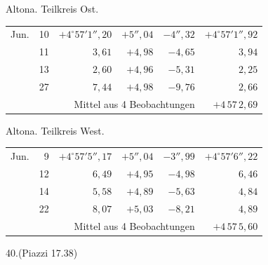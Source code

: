 \noindent\begin{minipage}[t]{.495\textwidth}\centering Altona. Teilkreis Ost.\par\smallskip
{\scriptsize\setlength{\tabcolsep}{1pt}\renewcommand{\arraystretch}{1.2}\begin{tabular}{lr|r|r|r|r|}
Jun.&10&$+4^\circ57'1''{,}20$&$+5''{,}04$&$-4''{,}32$&$+4^\circ57'1''{,}92$\\
&11&$3{,}61$&$+4{,}98$&$-4{,}65$&$3{,}94$\\
&13&$2{,}60$&$+4{,}96$&$-5{,}31$&$2{,}25$\\
&27&$7{,}44$&$+4{,}98$&$-9{,}76$&$2{,}66$\\
\cline{6-6}\multicolumn{5}{r}{Mittel aus 4 Beobachtungen}&$+4\,57\,2{,}69$
\end{tabular}}\end{minipage}\hfill\begin{minipage}[t]{.495\textwidth}\centering Altona. Teilkreis West.\par\smallskip
{\scriptsize\setlength{\tabcolsep}{1pt}\renewcommand{\arraystretch}{1.2}\begin{tabular}{lr|r|r|r|r}
Jun.&9&$+4^\circ57'5''{,}17$&$+5''{,}04$&$-3''{,}99$&$+4^\circ57'6''{,}22$\\
&12&$6{,}49$&$+4{,}95$&$-4{,}98$&$6{,}46$\\
&14&$5{,}58$&$+4{,}89$&$-5{,}63$&$4{,}84$\\
&22&$8{,}07$&$+5{,}03$&$-8{,}21$&$4{,}89$\\
\cline{6-6}\multicolumn{5}{r}{\raisebox{.3ex}{.}\,Mittel aus 4 Beobachtungen}&$+4\,57\,5{,}60$
\end{tabular}}\end{minipage}
\par\vspace{4mm}
\begin{center}40.\quad (Piazzi 17.38)\end{center}

